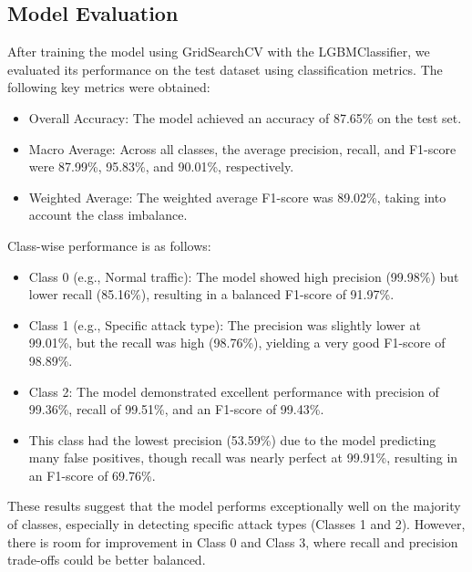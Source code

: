 \documentclass[conference]{IEEEtran}
\begin{document}
	\subsection{Model Evaluation}
	After training the model using GridSearchCV with the LGBMClassifier, we evaluated its performance on the test dataset using classification metrics. The following key metrics were obtained:
	\begin{itemize}
		\item Overall Accuracy: The model achieved an accuracy of 87.65\% on the test set.
		\item Macro Average: Across all classes, the average precision, recall, and F1-score were 87.99\%, 95.83\%, and 90.01\%, respectively.
		\item Weighted Average: The weighted average F1-score was 89.02\%, taking into account the class imbalance.
	\end{itemize}
	Class-wise performance is as follows:
	\begin{itemize}
		\item Class 0 (e.g., Normal traffic): The model showed high precision (99.98\%) but lower recall (85.16\%), resulting in a balanced F1-score of 91.97\%.
		\item Class 1 (e.g., Specific attack type): The precision was slightly lower at 99.01\%, but the recall was high (98.76\%), yielding a very good F1-score of 98.89\%.
		\item Class 2: The model demonstrated excellent performance with precision of 99.36\%, recall of 99.51\%, and an F1-score of 99.43\%.
		\item This class had the lowest precision (53.59\%) due to the model predicting many false positives, though recall was nearly perfect at 99.91\%, resulting in an F1-score of 69.76\%.
	\end{itemize}
	These results suggest that the model performs exceptionally well on the majority of classes, especially in detecting specific attack types (Classes 1 and 2). However, there is room for improvement in Class 0 and Class 3, where recall and precision trade-offs could be better balanced.
	
\end{document}
